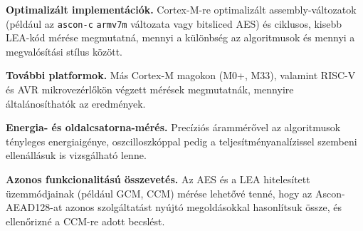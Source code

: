 \documentclass[a4paper,12pt]{report}
\theoremstyle{definition}
\theoremstyle{remark}
\begin{document}
\textbf{Optimalizált implementációk.} Cortex-M-re optimalizált assembly-változatok (például az \texttt{ascon-c} \texttt{armv7m} változata vagy bitsliced AES) és ciklusos, kisebb LEA-kód mérése megmutatná, mennyi a különbség az algoritmusok és mennyi a megvalósítási stílus között.

\textbf{További platformok.} Más Cortex-M magokon (M0+, M33), valamint RISC-V és AVR mikrovezérlőkön végzett mérések megmutatnák, mennyire általánosíthatók az eredmények.

\textbf{Energia- és oldalcsatorna-mérés.} Precíziós árammérővel az algoritmusok tényleges energiaigénye, oszcilloszkóppal pedig a teljesítményanalízissel szembeni ellenállásuk is vizsgálható lenne.

\textbf{Azonos funkcionalitású összevetés.} Az AES és a LEA hitelesített üzemmódjainak (például GCM, CCM) mérése lehetővé tenné, hogy az Ascon-AEAD128-at azonos szolgáltatást nyújtó megoldásokkal hasonlítsuk össze, és ellenőrizné a CCM-re adott becslést.
\end{document}

